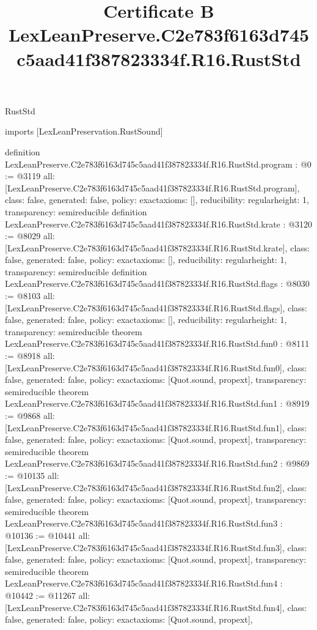 \begin{lexlean}{RustStd}
\title{Certificate B LexLeanPreserve.C2e783f6163d745c5aad41f387823334f.R16.RustStd}
\begin{coremodule}
imports [LexLeanPreservation.RustSound]

definition LexLeanPreserve.C2e783f6163d745c5aad41f387823334f.R16.RustStd.program : @0 := @3119 {
  all: [LexLeanPreserve.C2e783f6163d745c5aad41f387823334f.R16.RustStd.program],
  class: false,
  generated: false,
  policy: exact{axioms: []},
  reducibility: regular{height: 1},
  transparency: semireducible
}
definition LexLeanPreserve.C2e783f6163d745c5aad41f387823334f.R16.RustStd.krate : @3120 := @8029 {
  all: [LexLeanPreserve.C2e783f6163d745c5aad41f387823334f.R16.RustStd.krate],
  class: false,
  generated: false,
  policy: exact{axioms: []},
  reducibility: regular{height: 1},
  transparency: semireducible
}
definition LexLeanPreserve.C2e783f6163d745c5aad41f387823334f.R16.RustStd.flags : @8030 := @8103 {
  all: [LexLeanPreserve.C2e783f6163d745c5aad41f387823334f.R16.RustStd.flags],
  class: false,
  generated: false,
  policy: exact{axioms: []},
  reducibility: regular{height: 1},
  transparency: semireducible
}
theorem LexLeanPreserve.C2e783f6163d745c5aad41f387823334f.R16.RustStd.fun0 : @8111 := @8918 {
  all: [LexLeanPreserve.C2e783f6163d745c5aad41f387823334f.R16.RustStd.fun0],
  class: false,
  generated: false,
  policy: exact{axioms: [Quot.sound, propext]},
  transparency: semireducible
}
theorem LexLeanPreserve.C2e783f6163d745c5aad41f387823334f.R16.RustStd.fun1 : @8919 := @9868 {
  all: [LexLeanPreserve.C2e783f6163d745c5aad41f387823334f.R16.RustStd.fun1],
  class: false,
  generated: false,
  policy: exact{axioms: [Quot.sound, propext]},
  transparency: semireducible
}
theorem LexLeanPreserve.C2e783f6163d745c5aad41f387823334f.R16.RustStd.fun2 : @9869 := @10135 {
  all: [LexLeanPreserve.C2e783f6163d745c5aad41f387823334f.R16.RustStd.fun2],
  class: false,
  generated: false,
  policy: exact{axioms: [Quot.sound, propext]},
  transparency: semireducible
}
theorem LexLeanPreserve.C2e783f6163d745c5aad41f387823334f.R16.RustStd.fun3 : @10136 := @10441 {
  all: [LexLeanPreserve.C2e783f6163d745c5aad41f387823334f.R16.RustStd.fun3],
  class: false,
  generated: false,
  policy: exact{axioms: [Quot.sound, propext]},
  transparency: semireducible
}
theorem LexLeanPreserve.C2e783f6163d745c5aad41f387823334f.R16.RustStd.fun4 : @10442 := @11267 {
  all: [LexLeanPreserve.C2e783f6163d745c5aad41f387823334f.R16.RustStd.fun4],
  class: false,
  generated: false,
  policy: exact{axioms: [Quot.sound, propext]},
}
\end{coremodule}
\end{lexlean}

